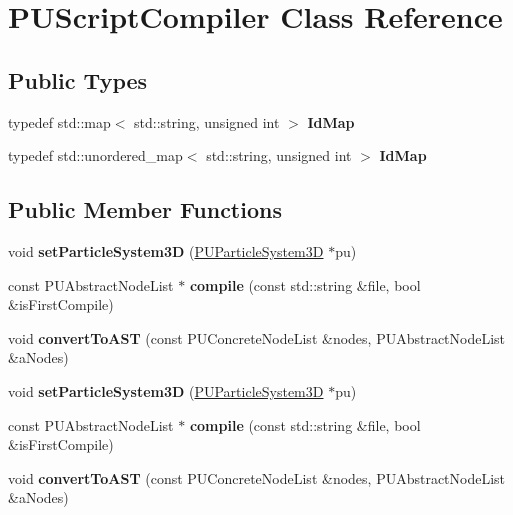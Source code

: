 \hypertarget{classPUScriptCompiler}{}\section{P\+U\+Script\+Compiler Class Reference}
\label{classPUScriptCompiler}
\subsection*{Public Types}
\begin{DoxyCompactItemize}
\item 
\mbox{\label{classPUScriptCompiler_adfc52143d2854b724b44d17d71924ac4}} 
typedef std\+::map$<$ std\+::string, unsigned int $>$ {\bfseries Id\+Map}
\item 
\mbox{\label{classPUScriptCompiler_a44655722bb5b16cb6174a241b6dd3618}} 
typedef std\+::unordered\+\_\+map$<$ std\+::string, unsigned int $>$ {\bfseries Id\+Map}
\end{DoxyCompactItemize}
\subsection*{Public Member Functions}
\begin{DoxyCompactItemize}
\item 
\mbox{\label{classPUScriptCompiler_ab3be37656c9f61a8fd81bf2b511c32fb}} 
void {\bfseries set\+Particle\+System3D} (\hyperlink{classPUParticleSystem3D}{P\+U\+Particle\+System3D} $\ast$pu)
\item 
\mbox{\label{classPUScriptCompiler_a0a2d9d43c39884022ccb7b2838b3e8f5}} 
const P\+U\+Abstract\+Node\+List $\ast$ {\bfseries compile} (const std\+::string \&file, bool \&is\+First\+Compile)
\item 
\mbox{\label{classPUScriptCompiler_a88b8692be2c49e716adfb51ccc23069a}} 
void {\bfseries convert\+To\+A\+ST} (const P\+U\+Concrete\+Node\+List \&nodes, P\+U\+Abstract\+Node\+List \&a\+Nodes)
\item 
\mbox{\label{classPUScriptCompiler_ab3be37656c9f61a8fd81bf2b511c32fb}} 
void {\bfseries set\+Particle\+System3D} (\hyperlink{classPUParticleSystem3D}{P\+U\+Particle\+System3D} $\ast$pu)
\item 
\mbox{\label{classPUScriptCompiler_aa72c2dbcb39ffd9c7df82a4d8d524272}} 
const P\+U\+Abstract\+Node\+List $\ast$ {\bfseries compile} (const std\+::string \&file, bool \&is\+First\+Compile)
\item 
\mbox{\label{classPUScriptCompiler_a88b8692be2c49e716adfb51ccc23069a}} 
void {\bfseries convert\+To\+A\+ST} (const P\+U\+Concrete\+Node\+List \&nodes, P\+U\+Abstract\+Node\+List \&a\+Nodes)
\end{DoxyCompactItemize}
